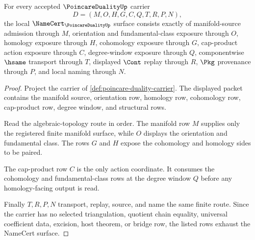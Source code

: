 \begin{theorem}
\label{thm:poincare-duality-namecert-obligations}
For every accepted $\PoincareDualityUp$ carrier
$$
D=(M,O,H,G,C,Q,T,R,P,N),
$$
the local $\NameCert_{\PoincareDualityUp}$ surface consists exactly of manifold-source admission through $M$, orientation and fundamental-class exposure through $O$, homology exposure through $H$, cohomology exposure through $G$, cap-product action exposure through $C$, degree-window exposure through $Q$, componentwise $\hsame$ transport through $T$, displayed $\Cont$ replay through $R$, $\Pkg$ provenance through $P$, and local naming through $N$.
\end{theorem}
\begin{proof}
Project the carrier of \autoref{def:poincare-duality-carrier}. The displayed packet contains the manifold source, orientation row, homology row, cohomology row, cap-product row, degree window, and structural rows.

Read the algebraic-topology route in order. The manifold row $M$ supplies only the registered finite manifold surface, while $O$ displays the orientation and fundamental class. The rows $G$ and $H$ expose the cohomology and homology sides to be paired.

The cap-product row $C$ is the only action coordinate. It consumes the cohomology and fundamental-class rows at the degree window $Q$ before any homology-facing output is read.

Finally $T,R,P,N$ transport, replay, source, and name the same finite route. Since the carrier has no selected triangulation, quotient chain equality, universal coefficient data, excision, host theorem, or bridge row, the listed rows exhaust the NameCert surface.
\end{proof}

